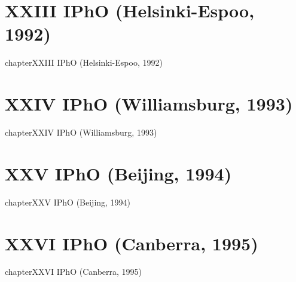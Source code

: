 \documentclass[12pt,a4paper]{book}
\begin{document}
\chapter*{XXIII IPhO (Helsinki-Espoo, 1992)}
{chapter}{XXIII IPhO (Helsinki-Espoo, 1992)}
\chapter*{XXIV IPhO (Williamsburg, 1993)}
{chapter}{XXIV IPhO (Williamsburg, 1993)}
\chapter*{XXV IPhO (Beijing, 1994)}
{chapter}{XXV IPhO (Beijing, 1994)}
\chapter*{XXVI IPhO (Canberra, 1995)}
{chapter}{XXVI IPhO (Canberra, 1995)}
\end{document}
